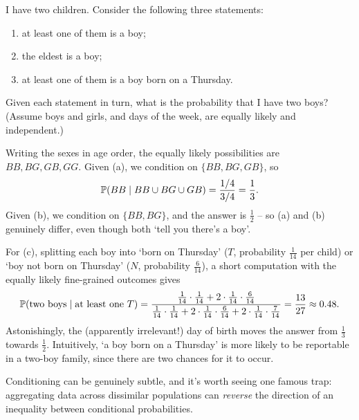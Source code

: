 \documentclass[a4paper]{scrartcl}
\begin{document}
\begin{example}
	I have two children. Consider the following three statements:
	\begin{enumerate}[label=(\alph*)]
		\item at least one of them is a boy;
		\item the eldest is a boy;
		\item at least one of them is a boy born on a Thursday.
	\end{enumerate}
	Given each statement in turn, what is the probability that I have two boys? (Assume boys and girls, and days of the week, are equally likely and independent.)

	Writing the sexes in age order, the equally likely possibilities are $BB, BG, GB, GG$. Given (a), we condition on $\{BB, BG, GB\}$, so
	$$
	\mathbb{P}(BB \mid BB \cup BG \cup GB) = \frac{1/4}{3/4} = \frac13.
	$$
	Given (b), we condition on $\{BB, BG\}$, and the answer is $\frac12$ -- so (a) and (b) genuinely differ, even though both `tell you there's a boy'.

	For (c), splitting each boy into `born on Thursday' ($T$, probability $\frac{1}{14}$ per child) or `boy not born on Thursday' ($N$, probability $\frac{6}{14}$), a short computation with the equally likely fine-grained outcomes gives
	$$
	\mathbb{P}(\text{two boys} \mid \text{at least one } T) = \frac{\frac{1}{14}\cdot\frac{1}{14} + 2\cdot\frac{1}{14}\cdot\frac{6}{14}}{\frac{1}{14}\cdot\frac{1}{14} + 2\cdot\frac{1}{14}\cdot\frac{6}{14} + 2 \cdot \frac{1}{14}\cdot\frac{7}{14}} = \frac{13}{27} \approx 0.48.
	$$
	Astonishingly, the (apparently irrelevant!) day of birth moves the answer from $\frac13$ towards $\frac12$. Intuitively, `a boy born on a Thursday' is more likely to be reportable in a two-boy family, since there are two chances for it to occur.
\end{example}

Conditioning can be genuinely subtle, and it's worth seeing one famous trap: aggregating data across dissimilar populations can \emph{reverse} the direction of an inequality between conditional probabilities.
\end{document}
